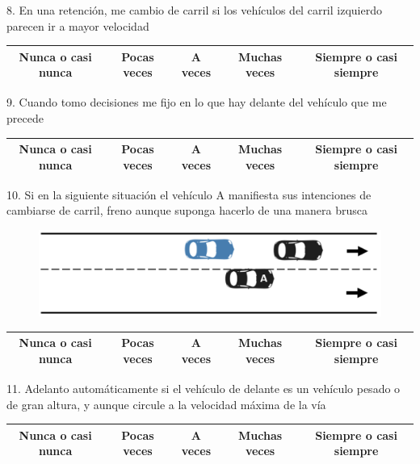 8. En una retención, me cambio de carril si los vehículos del carril izquierdo parecen ir a mayor velocidad 
\vspace{-10pt}
\begin{table}[H]
\centering
\begin{tabular}{|c|c|c|c|c|}
\hline
Nunca o casi nunca & Pocas veces & A veces & Muchas veces & Siempre o casi siempre \\ \hline
\end{tabular}
\end{table}

9. Cuando tomo decisiones me fijo en lo que hay delante del vehículo que me precede
\vspace{-10pt}
\begin{table}[H]
\centering
\begin{tabular}{|c|c|c|c|c|}
\hline
Nunca o casi nunca & Pocas veces & A veces & Muchas veces & Siempre o casi siempre \\ \hline
\end{tabular}
\end{table}

10. Si en la siguiente situación el vehículo A manifiesta sus intenciones de cambiarse de carril, freno aunque suponga hacerlo de una manera brusca 
\begin{figure}[h]
    \centering
    \includegraphics[width=14cm]
    {figures/B2.png}
\end{figure}
\vspace{-10pt}
\begin{table}[h]
\centering
\begin{tabular}{|c|c|c|c|c|}
\hline
Nunca o casi nunca & Pocas veces & A veces & Muchas veces & Siempre o casi siempre \\ \hline
\end{tabular}
\end{table}

11. Adelanto automáticamente si el vehículo de delante es un vehículo pesado o de gran altura, y aunque circule a la velocidad máxima de la vía
\vspace{-10pt}
\begin{table}[h]
\centering
\begin{tabular}{|c|c|c|c|c|}
\hline
Nunca o casi nunca & Pocas veces & A veces & Muchas veces & Siempre o casi siempre \\ \hline
\end{tabular}
\end{table}

